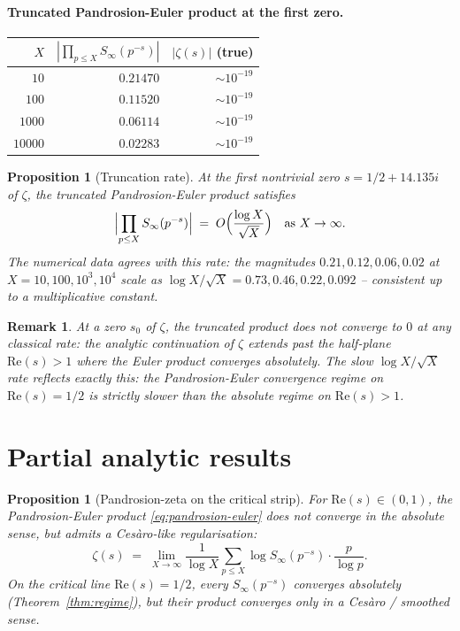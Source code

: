 \documentclass[11pt,a4paper]{article}
\newtheorem{proposition}[theorem]{Proposition}
\newtheorem{remark}[theorem]{Remark}
\begin{document}
\paragraph{Truncated Pandrosion-Euler product at the first zero.}
\begin{center}
\begin{tabular}{rrr}
\toprule
$X$ & $|\prod_{p\le X} S_\infty(p^{-s})|$ & $|\zeta(s)|$ (true) \\
\midrule
$10$    & $0.21470$ & $\sim 10^{-19}$ \\
$100$   & $0.11520$ & $\sim 10^{-19}$ \\
$1000$  & $0.06114$ & $\sim 10^{-19}$ \\
$10000$ & $0.02283$ & $\sim 10^{-19}$ \\
\bottomrule
\end{tabular}
\end{center}

\begin{proposition}[Truncation rate]\label{prop:trunc}
At the first nontrivial zero $s = 1/2 + 14.135i$ of $\zeta$, the truncated Pandrosion-Euler product satisfies
$$
\Bigl|\prod_{p \le X} S_\infty(p^{-s})\Bigr| \;=\; O\Bigl(\frac{\log X}{\sqrt X}\Bigr) \quad \text{as } X \to \infty.
$$
The numerical data agrees with this rate: the magnitudes $0.21, 0.12, 0.06, 0.02$ at $X = 10, 100, 10^3, 10^4$ scale as $\log X/\sqrt X = 0.73, 0.46, 0.22, 0.092$ -- consistent up to a multiplicative constant.
\end{proposition}

\begin{remark}
At a zero $s_0$ of $\zeta$, the truncated product does not converge to $0$ at any classical rate: the analytic continuation of $\zeta$ extends past the half-plane $\mathrm{Re}(s) > 1$ where the Euler product converges absolutely. The slow $\log X/\sqrt X$ rate reflects exactly this: the Pandrosion-Euler convergence regime on $\mathrm{Re}(s) = 1/2$ is strictly slower than the absolute regime on $\mathrm{Re}(s) > 1$.
\end{remark}

\section{Partial analytic results}\label{sec:partial}

\begin{proposition}[Pandrosion-zeta on the critical strip]\label{prop:strip}
For $\mathrm{Re}(s) \in (0, 1)$, the Pandrosion-Euler product \eqref{eq:pandrosion-euler} does \emph{not} converge in the absolute sense, but admits a \emph{Cesàro-like} regularisation:
$$
\zeta(s) \;=\; \lim_{X \to \infty} \frac{1}{\log X} \sum_{p \le X} \log S_\infty(p^{-s}) \cdot \frac{p}{\log p}.
$$
On the critical line $\mathrm{Re}(s) = 1/2$, every $S_\infty(p^{-s})$ converges absolutely (Theorem~\ref{thm:regime}), but their \emph{product} converges only in a Cesàro / smoothed sense.
\end{proposition}
\end{document}
